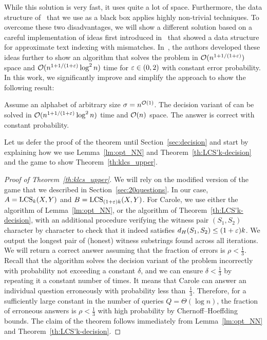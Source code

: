 While this solution is very fast, it uses quite a lot of space. Furthermore, the data structure of~\cite{DBLP:conf/stoc/AndoniR15} that we use as a black box applies highly non-trivial techniques. To overcome these two disadvantages, we will show a different solution based on a careful implementation of ideas first introduced in~\cite{substringNN} that showed a data structure for approximate text indexing with mismatches. In~\cite{DBLP:journals/algorithmica/KociumakaRS19}, the authors developed these ideas further to show an algorithm that solves the \kApproxLCS problem in $\mathcal{O}(n^{1+1/(1+\varepsilon)} )$ space and $\mathcal{O} (n^{1+1/(1+\varepsilon)} \log^2 n)$ time for $\varepsilon\in(0,2)$ with constant error probability. In this work, we significantly improve and simplify the approach to show the following result:  

\begin{theorem}\label{th:LCS'k-decision}
Assume an alphabet of arbitrary size $\sigma = n^{\mathcal{O}(1)}$. The decision variant of \kApproxLCS can be solved in $\mathcal{O}(n^{1+1/(1+\varepsilon)} \log^2 n)$ time and $\mathcal{O}(n)$ space. The answer is correct with constant probability. 
\end{theorem}

Let us defer the proof of the theorem until Section~\ref{sec:decision} and start by explaining how we use Lemma~\ref{lm:opt_NN} and Theorem~\ref{th:LCS'k-decision} and the \twentyquestions game to show Theorem~\ref{th:klcs_upper}.

\begin{proof}[Proof of Theorem~\ref{th:klcs_upper}]
We will rely on the modified version of the \twentyquestions game that we
  described in Section~\ref{sec:20questions}. In our case, $A = \mathrm{LCS}_{k}(X,Y)$ and
  $B = \mathrm{LCS}_{(1+\varepsilon)k}(X,Y)$. For Carole, we use either the algorithm of
  Lemma~\ref{lm:opt_NN}, or the algorithm of Theorem~\ref{th:LCS'k-decision}, 
  with an additional procedure verifying the witness pair $(S_1,S_2)$ character by character to check that it indeed satisfies $d_H(S_1,S_2)\le (1+\varepsilon)k$.
  We output the longest pair of (honest) witness
  substrings found across all iterations. We will return a correct answer
  assuming that the fraction of errors is $\rho <\frac13$. Recall that the algorithm solves the decision variant of the \kApproxLCS problem incorrectly with probability not exceeding a constant $\delta$, and we can ensure $\delta < \frac13$ by repeating it a constant number of times. It means that Carole can answer an individual question erroneously with probability less than~$\frac13$. Therefore, for a sufficiently large constant in the number of queries $Q = \Theta(\log n)$, the fraction of erroneous answers is $\rho < \frac13$ with high probability by Chernoff--Hoeffding bounds. The claim of the theorem follows immediately from Lemma~\ref{lm:opt_NN} and Theorem~\ref{th:LCS'k-decision}.
\end{proof}

